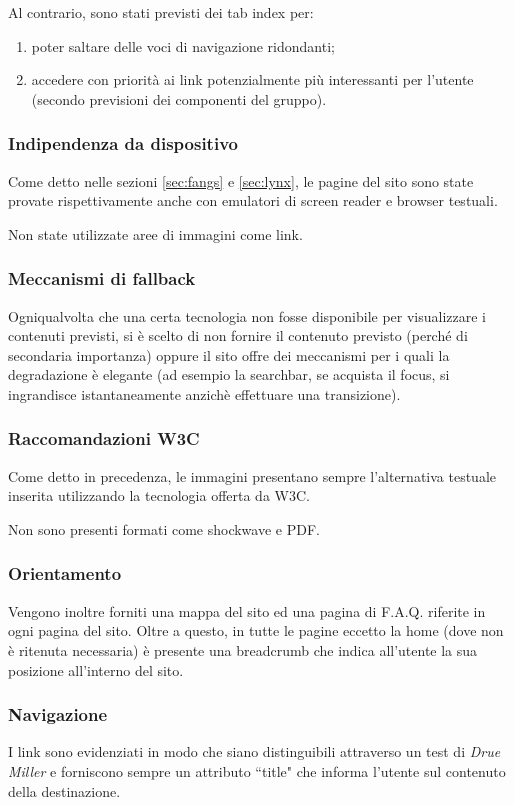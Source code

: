Al contrario, sono stati previsti dei tab index per:
\begin{enumerate}
\item poter saltare delle voci di navigazione ridondanti;
\item accedere con priorità ai link potenzialmente più interessanti per
l'utente (secondo previsioni dei componenti del gruppo).
\end{enumerate}

\subsubsection{Indipendenza da dispositivo}
Come detto nelle sezioni \ref{sec:fangs} e \ref{sec:lynx}, le pagine del sito
sono state provate rispettivamente anche con emulatori di screen reader e
browser testuali.

Non state utilizzate aree di immagini come link.

\subsubsection{Meccanismi di fallback}
Ogniqualvolta che una certa tecnologia non fosse disponibile per visualizzare i
contenuti previsti, si è scelto di non fornire il contenuto previsto (perché
di secondaria importanza) oppure il sito offre dei meccanismi per i quali la
degradazione è elegante (ad esempio la searchbar, se acquista il focus, si
ingrandisce istantaneamente anzichè effettuare una transizione).

\subsubsection{Raccomandazioni W3C}
Come detto in precedenza, le immagini presentano sempre l'alternativa testuale
inserita utilizzando la tecnologia offerta da W3C.

Non sono presenti formati come shockwave e PDF.

\subsubsection{Orientamento}
Vengono inoltre forniti una mappa del sito ed una pagina di F.A.Q. riferite in
ogni pagina del sito. Oltre a questo, in tutte le pagine eccetto la home (dove
non è ritenuta necessaria) è presente una breadcrumb che indica all'utente la
sua posizione all'interno del sito.

\subsubsection{Navigazione} %
I link sono evidenziati in modo che siano distinguibili attraverso un test di \textit{Drue Miller} e forniscono sempre un attributo ``title" che informa
l'utente sul contenuto della destinazione.

